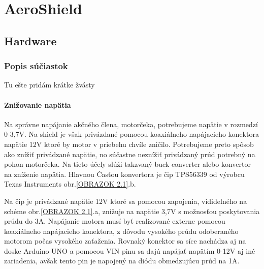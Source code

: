 \chapter{AeroShield}

\section{Hardware}


\subsection{Popis súčiastok}

Tu ešte pridám krátke žvásty

\subsubsection{Znižovanie napätia}

Na správne napájanie akčného člena, motorčeka, potrebujeme napätie v rozmedzí 0-3,7V. Na shield je však privázdané pomocou koaxiálneho napájacieho konektora napätie 12V ktoré by motor v priebehu chvíle zničilo. Potrebujeme preto spôsob ako znížiť privádzané napätie, no súčastne neznížiť privádzaný prúd potrebný na pohon motorčeka. Na tieto účely slúži takzvaný buck converter alebo konvertor na zníženie napätia. Hlavnou Časťou konvertora je čip TPS56339 od výrobcu Texas Instruments obr.\ref{OBRAZOK 2.1}.b.

 Na čip je privádzané napätie 12V ktoré sa pomocou zapojenia, vididelného na schéme obr.\ref{OBRAZOK 2.1}.a, znižuje na napätie 3,7V s možnosťou poskytovania prúdu do 3A. Napájanie motora musí byť realizované externe pomocou koaxiálneho napájacieho konektora, z dôvodu vysokého prúdu odoberaného motorom počas vysokého zaťaženia. Rovnaký konektor sa síce nachádza aj na doske Arduino UNO a pomocou VIN pinu sa dajú napájať napätím 0-12V aj iné zariadenia, avšak tento pin je napojený na diódu obmedzujúcu prúd na 1A\cite{ampere}\cite{ampere2}.

